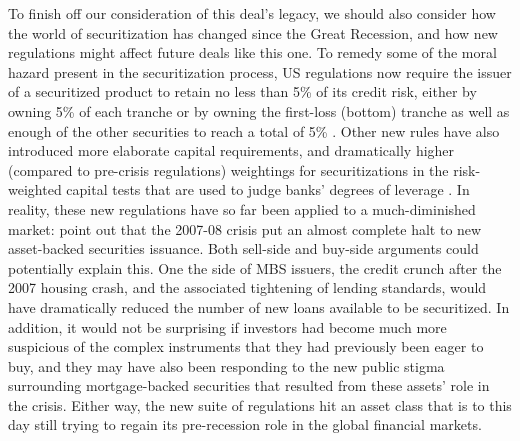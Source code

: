\documentclass[12pt]{article}
\begin{document}
To finish off our consideration of this deal’s legacy, we should also consider how the world of securitization has changed since the Great Recession, and how new regulations might affect future deals like this one. To remedy some of the moral hazard present in the securitization process, US regulations now require the issuer of a securitized product to retain no less than 5\% of its credit risk, either by owning 5\% of each tranche or by owning the first-loss (bottom) tranche as well as enough of the other securities to reach a total of 5\% \parencite{scheicher17}. Other new rules have also introduced more elaborate capital requirements, and dramatically higher (compared to pre-crisis regulations) weightings for securitizations in the risk-weighted capital tests that are used to judge banks’ degrees of leverage \parencite{scheicher17}. In reality, these new regulations have so far been applied to a much-diminished market: \textcite{gorton12} point out that the 2007-08 crisis put an almost complete halt to new asset-backed securities issuance. Both sell-side and buy-side arguments could potentially explain this. One the side of MBS issuers, the credit crunch after the 2007 housing crash, and the associated tightening of lending standards, would have dramatically reduced the number of new loans available to be securitized. In addition, it would not be surprising if investors had become much more suspicious of the complex instruments that they had previously been eager to buy, and they may have also been responding to the new public stigma surrounding mortgage-backed securities that resulted from these assets’ role in the crisis. Either way, the new suite of regulations hit an asset class that is to this day still trying to regain its pre-recession role in the global financial markets.
\end{document}
